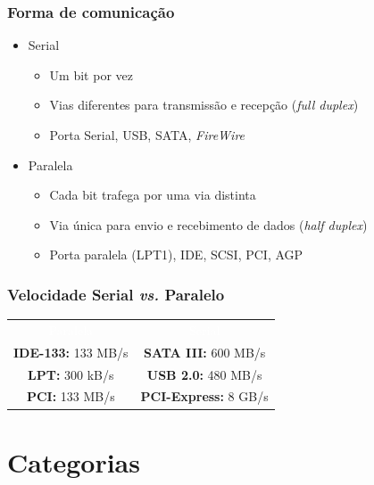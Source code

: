 \documentclass[aspectratio=169,
				xcolor=table]{beamer}
\begin{document}
	\begin{frame}
		\frametitle{Forma de comunicação}
		\begin{itemize}
			\item Serial 
			\begin{itemize}
				\item Um bit por vez
				\item Vias diferentes para transmissão e recepção (\textit{full duplex})
				\item Porta Serial, USB, SATA, \textit{FireWire}
			\end{itemize}
			\vspace{1em}
			\item Paralela
			\begin{itemize}
				\item Cada bit trafega por uma via distinta
				\item Via única para envio e recebimento de dados (\textit{half duplex})
				\item Porta paralela (LPT1), IDE, SCSI, PCI, AGP
				
			\end{itemize}
		\end{itemize}
	\end{frame}
	
	\begin{frame}
		\frametitle{Velocidade Serial \textit{vs.} Paralelo}
		\begin{eftable}

		\begin{tabular}{cc}
		\textcolor{white}{Paralela} & \textcolor{white}{Serial} \\ 
		\textbf{IDE-133:} 133 MB/s & \textbf{SATA III:} 600 MB/s \\ 
		\textbf{LPT:} 300 kB/s & \textbf{USB 2.0:} 480 MB/s \\ 
		\textbf{PCI:} 133 MB/s & \textbf{PCI-Express:} 8 GB/s \\ 
		\end{tabular} 		
		\end{eftable}
	\end{frame}

		
	\section{Categorias}
	
\end{document}
